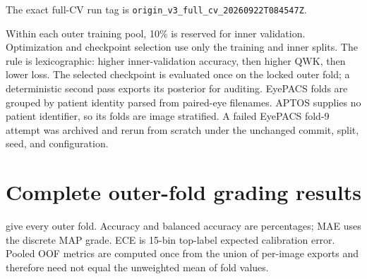 \documentclass[10pt,twocolumn,letterpaper]{article}
\begin{document}
The exact full-CV run tag is
\nolinkurl{origin_v3_full_cv_20260922T084547Z}.

Within each outer training pool, 10\% is reserved for inner validation.
Optimization and checkpoint selection use only the training and inner splits.
The rule is lexicographic: higher inner-validation accuracy, then higher QWK,
then lower loss.  The selected checkpoint is evaluated once on the locked
outer fold; a deterministic second pass exports its posterior for auditing.
EyePACS folds are grouped by patient identity parsed from paired-eye filenames.
APTOS supplies no patient identifier, so its folds are image stratified.  A
failed EyePACS fold-9 attempt was archived and rerun from scratch under the
unchanged commit, split, seed, and configuration.

\section{Complete outer-fold grading results}
\label{sec:fold-results}

 give every outer fold.  Accuracy and
balanced accuracy are percentages; MAE uses the discrete MAP grade.  ECE is
15-bin top-label expected calibration error.  Pooled OOF metrics are computed
once from the union of per-image exports and therefore need not equal the
unweighted mean of fold values.
\end{document}
